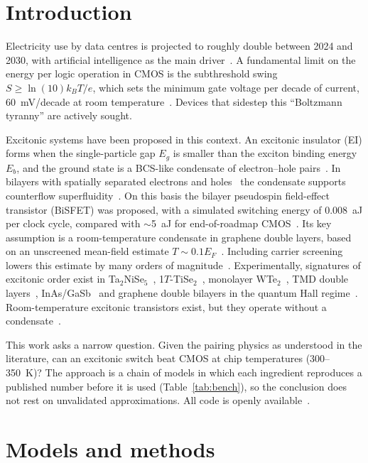 \documentclass[aip,jap,reprint,amsmath,amssymb]{revtex4-2}
\begin{document}
\section{Introduction}

Electricity use by data centres is projected to roughly double between 2024 and 2030, with artificial
intelligence as the main driver~\cite{IEA2025}. A fundamental limit on the energy per logic operation in
CMOS is the subthreshold swing $S \ge \ln(10)k_BT/e$, which sets the minimum gate voltage per decade of
current, 60~mV/decade at room temperature~\cite{IonescuRiel2011}. Devices that sidestep this
``Boltzmann tyranny'' are actively sought.

Excitonic systems have been proposed in this context. An excitonic insulator (EI) forms when the
single-particle gap $E_g$ is smaller than the exciton binding energy $E_b$, and the ground state is a
BCS-like condensate of electron--hole pairs~\cite{Jerome1967,Kaneko2013}. In bilayers with spatially separated
electrons and holes~\cite{LozovikYudson1976,Pieri2007} the condensate supports counterflow superfluidity~\cite{LozovikYudson1976,Min2008}. On this basis the
bilayer pseudospin field-effect transistor (BiSFET) was proposed, with a simulated switching energy of
0.008~aJ per clock cycle, compared with $\sim$5~aJ for end-of-roadmap CMOS~\cite{Banerjee2009}.
Its key assumption is a room-temperature condensate in graphene double layers, based on an unscreened
mean-field estimate $T\sim 0.1E_F$~\cite{Min2008}. Including carrier screening lowers this estimate by many
orders of magnitude~\cite{Kharitonov2008}. Experimentally, signatures of excitonic order exist in
Ta$_2$NiSe$_5$~\cite{Wakisaka2009,Lu2017,Seki2014}, 1$T$-TiSe$_2$~\cite{Kogar2017},
monolayer WTe$_2$~\cite{Jia2022,Sun2022}, TMD double layers~\cite{Wang2019,Ma2021},
InAs/GaSb~\cite{Du2017} and graphene double bilayers in the quantum Hall regime~\cite{Li2017,Liu2017}.
Room-temperature excitonic transistors exist, but they operate without a condensate~\cite{Unuchek2018}.

This work asks a narrow question. Given the pairing physics as understood in the literature, can an
excitonic switch beat CMOS at chip temperatures (300--350~K)? The approach is a chain of models in which
each ingredient reproduces a published number before it is used (Table~\ref{tab:bench}), so the
conclusion does not rest on unvalidated approximations. All code is openly available~\cite{repo}.

\section{Models and methods}
\end{document}
